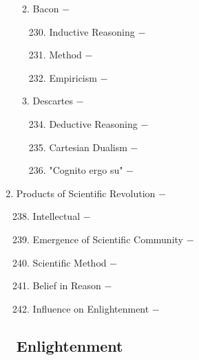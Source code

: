 \documentclass[12pt]{article}
\begin{document}
\begin{enumerate}
\begin{enumerate}[label=\arabic{*}.]
\begin{enumerate}[label=\arabic{*}.]
\end{enumerate}
\setcounter{enumii}{228}

\item Bacon $-$ 

\begin{enumerate}[label=\arabic{*}.]
\setcounter{enumiii}{229}

\item Inductive Reasoning $-$ 

\item Method $-$

\item Empiricism $-$

\end{enumerate}
\setcounter{enumii}{232}

\item Descartes $-$ 

\begin{enumerate}[label=\arabic{*}.]
\setcounter{enumiii}{233}

\item Deductive Reasoning $-$ 

\item Cartesian Dualism $-$

\item "Cognito ergo su" $-$ 

\end{enumerate}

\end{enumerate}
\setcounter{enumi}{236}

\item Products of Scientific Revolution $-$

\begin{enumerate}[label=\arabic{*}.]
\setcounter{enumii}{237}

\item Intellectual $-$ 

\item Emergence of Scientific Community $-$

\item Scientific Method $-$ 

\item Belief in Reason $-$

\item Influence on Enlightenment $-$

\end{enumerate}
\setcounter{enumi}{242}
\subsection{Enlightenment}


\end{enumerate}
\end{document}
